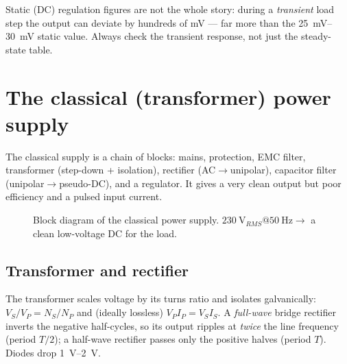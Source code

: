 \documentclass[11pt,a4paper,oneside]{book}
\begin{document}
\begin{warning}
Static (DC) regulation figures are not the whole story: during a \emph{transient}
load step the output can deviate by hundreds of mV --- far more than the
\qtyrange{25}{30}{\milli\volt} static value. Always check the transient response,
not just the steady-state table.
\end{warning}

\chapter{The classical (transformer) power supply}\label{ch:classic}

The classical supply is a chain of blocks: mains, protection, EMC filter,
transformer (step-down + isolation), rectifier (AC$\to$unipolar), capacitor
filter (unipolar$\to$pseudo-DC), and a regulator. It gives a very clean output
but poor efficiency and a pulsed input current.

\begin{figure}[h]\centering
{}
\caption{Block diagram of the classical power supply.
$\qty{230}{\volt_{RMS}}@\qty{50}{\hertz}\to$ a clean low-voltage DC for the load.}
\label{fig:psblock}
\end{figure}

\section{Transformer and rectifier}
The transformer scales voltage by its turns ratio and isolates galvanically:
$V_S/V_P=N_S/N_P$ and (ideally lossless) $V_PI_P=V_SI_S$. A \emph{full-wave}
bridge rectifier inverts the negative half-cycles, so its output ripples at
\emph{twice} the line frequency (period $T/2$); a half-wave rectifier passes only
the positive halves (period $T$). Diodes drop \qtyrange{1}{2}{\volt}.
\end{document}
